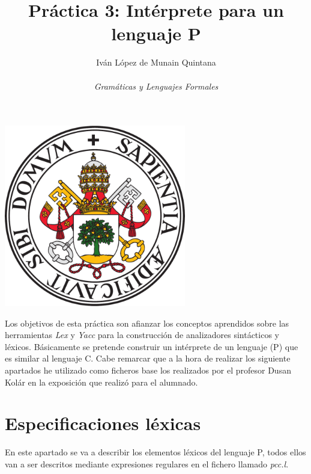\documentclass[11pt]{article}
\begin{document}
\title{\textbf{ Práctica 3: Intérprete para un lenguaje P}}
\author{
        Iván López de Munain Quintana\\ \\
\textit{Gramáticas y Lenguajes Formales}}

\maketitle

\vspace{50px}
\begin{center}
    \includegraphics[width=300px, height=300px]{escudo_uva.png}    
\end{center}

\newpage

\setcounter{tocdepth}{2}
\tableofcontents


\newpage

\noindent Los objetivos de esta práctica son afianzar los conceptos aprendidos sobre las herramientas \textit{Lex} y \textit{Yacc} para la construcción de analizadores sintácticos y léxicos. Básicamente se pretende construir un intérprete de un lenguaje (P) que es similar al lenguaje C. Cabe remarcar que a la hora de realizar los siguiente apartados he utilizado como ficheros base los realizados por el profesor Dusan Kolár \footnotemark en la exposición que realizó para el alumnado.


\section{Especificaciones léxicas}

\noindent En este apartado se va a describir los elementos léxicos del lenguaje P, todos ellos van a ser descritos mediante expresiones regulares en el fichero llamado \textit{pcc.l}.
\end{document}
